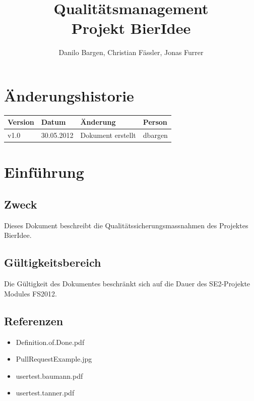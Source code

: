 \documentclass[10pt,a4paper]{scrartcl}
\author{Danilo Bargen, Christian Fässler, Jonas Furrer}
\title{Qualitätsmanagement\\ Projekt BierIdee}
\begin{document}
\begin{titlepage}
	\maketitle
	\vspace{120mm}
	\thispagestyle{empty} %
\end{titlepage}

\tableofcontents
\newpage

\section*{Änderungshistorie}
\begin{tabular}{p{}p{}p{}p{}}
\toprule
\textbf{Version} & \textbf{Datum} & \textbf{Änderung} & \textbf{Person} \\  
\midrule
v1.0 & 30.05.2012 & Dokument erstellt & dbargen \\  
\bottomrule
\end{tabular} 
\newpage


\section{Einführung}

\subsection{Zweck}
Dieses Dokument beschreibt die Qualitätssicherungsmassnahmen des Projektes BierIdee.

\subsection{Gültigkeitsbereich}
Die Gültigkeit des Dokumentes beschränkt sich auf die Dauer des SE2-Projekte Modules FS2012.

\subsection{Referenzen}

\begin{itemize}
	\item Definition.of.Done.pdf
	\item PullRequestExample.jpg
	\item usertest.baumann.pdf
	\item usertest.tanner.pdf
\end{itemize}
\end{document}
